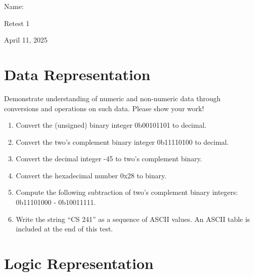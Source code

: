 \documentclass[12pt]{article}
\begin{document}
Name: \makebox[3in]{\hrulefill
\hrulefill}

\vfill

\begin{center}
{\huge Retest 1}

{\large April 11, 2025}
\end{center}

\testrules

\vfill

\pledge

\newpage


\section*{Data Representation}

Demonstrate understanding of numeric and non-numeric data through conversions and operations on such data. Please show your work!

\begin{enumerate}
\item Convert the (unsigned) binary integer 0b00101101 to decimal.
\vfill

\item Convert the two's complement binary integer 0b11110100 to decimal.
\vfill

\item Convert the decimal integer -45 to two's complement binary.
\vfill

\pagebreak

\item Convert the hexadecimal number 0x28 to binary.
\vfill

\item Compute the following subtraction of two's complement binary integers: 0b11101000 - 0b10011111. 
\vfill

\item Write the string ``CS 241'' as a sequence of ASCII values. An ASCII table is included at the end of this test.
\vfill
\end{enumerate}

\vfill

\standardsfooter

\newpage



\section*{Logic Representation}
\end{document}
